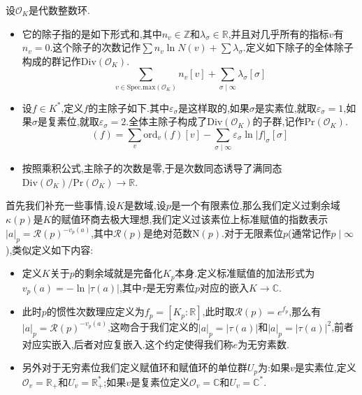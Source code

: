 设$\mathscr{O}_K$是代数整数环.
\begin{itemize}
	\item 它的除子指的是如下形式和,其中$n_v\in\mathbb{Z}$和$\lambda_{\sigma}\in\mathbb{R}$,并且对几乎所有的指标$v$有$n_v=0$.这个除子的次数记作$\sum n_v\ln N(v)+\sum\lambda_{\sigma}$.定义如下除子的全体除子构成的群记作$\mathrm{Div}(\mathscr{O}_K)$.
	$$\sum_{v\in\mathrm{Spec.max}(\mathscr{O}_K)}n_v[v]+\sum_{\sigma\mid\infty}\lambda_{\sigma}[\sigma]$$
	\item 设$f\in K^*$,定义$f$的主除子如下.其中$\varepsilon_{\sigma}$是这样取的,如果$\sigma$是实素位,就取$\varepsilon_{\sigma}=1$,如果$\sigma$是复素位,就取$\varepsilon_{\sigma}=2$.全体主除子构成了$\mathrm{Div}(\mathscr{O}_K)$的子群,记作$\mathrm{Pr}(\mathscr{O}_K)$.
	$$(f)=\sum_v\mathrm{ord}_v(f)[v]-\sum_{\sigma\mid\infty}\varepsilon_{\sigma}\ln|f|_{\sigma}[\sigma]$$
	\item 按照乘积公式,主除子的次数是零,于是次数同态诱导了满同态$\mathrm{Div}(\mathscr{O}_K)/\mathrm{Pr}(\mathscr{O}_K)\to\mathbb{R}$.
\end{itemize}











首先我们补充一些事情,设$K$是数域,设$p$是一个有限素位,那么我们定义过剩余域$\kappa(p)$是$K$的赋值环商去极大理想,我们定义过该素位上标准赋值的指数表示$|a|_p=\mathscr{R}(p)^{-v_p(a)}$,其中$\mathscr{R}(p)$是绝对范数$\mathrm{N}(p)$.对于无限素位$p$(通常记作$p\mid\infty$),类似定义如下内容:
\begin{itemize}
	\item 定义$K$关于$p$的剩余域就是完备化$K_p$本身.定义标准赋值的加法形式为$v_p(a)=-\ln|\tau(a)|$,其中$\tau$是无穷素位$p$对应的嵌入$K\to\mathbb{C}$.
	\item 此时$p$的惯性次数理应定义为$f_p=[K_p:\mathbb{R}]$,此时取$\mathscr{R}(p)=e^{f_p}$,那么有$|a|_p=\mathscr{R}(p)^{-v_p(a)}$,这吻合于我们定义的$|a|_p=|\tau(a)|$和$|a|_p=|\tau(a)|^2$,前者对应实嵌入,后者对应复嵌入.这个约定使得我们称$e$为无穷素数.
	\item 另外对于无穷素位我们定义赋值环和赋值环的单位群$U_p$为:如果$v$是实素位,定义$\mathscr{O}_v=\mathbb{R}_+$和$U_v=\mathbb{R}_+^*$;如果$v$是复素位定义$\mathscr{O}_v=\mathbb{C}$和$U_v=\mathbb{C}^*$.
\end{itemize}

